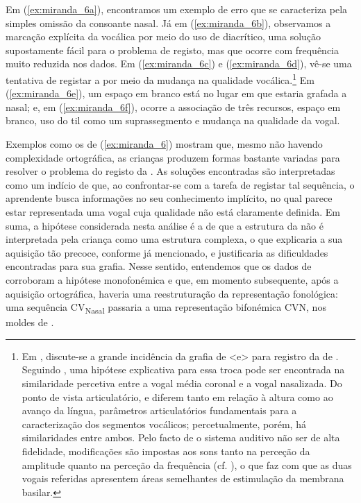 \documentclass[output=paper]{LSP/langsci}
\begin{document}
	Em (\ref{ex:miranda_6a}), encontramos um exemplo de erro que se caracteriza pela simples omissão da consoante nasal. Já em (\ref{ex:miranda_6b}), observamos a marcação explícita da  vocálica por meio do uso de diacrítico, uma solução supostamente fácil para o problema de registo, mas que ocorre com frequência muito reduzida nos dados. Em (\ref{ex:miranda_6c}) e (\ref{ex:miranda_6d}), vê-se uma tentativa de registar a  por meio da mudança na qualidade vocálica.\footnote{Em \citet{miranda2009}, discute-se a grande incidência da grafia de <e> para registro da  de . Seguindo \citet{berti_etal2008}, uma hipótese explicativa para essa troca pode ser encontrada na similaridade percetiva entre a vogal média coronal e a vogal nasalizada. Do ponto de vista articulatório,  e  diferem tanto em relação à altura como ao avanço da língua, parâmetros articulatórios fundamentais para a caracterização dos segmentos vocálicos; percetualmente, porém, há similaridades entre ambos. Pelo facto de o sistema auditivo não ser de alta fidelidade, modificações são impostas aos sons tanto na perceção da amplitude quanto na perceção da frequência (cf. \citealt{humejohnson2001}), o que faz com que as duas vogais referidas apresentem áreas semelhantes de estimulação da membrana basilar.} Em (\ref{ex:miranda_6e}), um espaço em branco está no lugar em que estaria grafada a nasal; e, em (\ref{ex:miranda_6f}), ocorre a associação de três recursos, espaço em branco, uso do til como um suprassegmento e mudança na qualidade da vogal.
    
Exemplos como os de (\ref{ex:miranda_6}) mostram que, mesmo não havendo complexidade ortográfica, as crianças produzem formas bastante variadas para resolver o problema do registo da . As soluções encontradas são interpretadas como um indício de que, ao confrontar-se com a tarefa de registar tal sequência, o aprendente busca informações no seu conhecimento implícito, no qual parece estar representada uma vogal cuja qualidade não está claramente definida. Em suma, a hipótese considerada nesta análise é a de que a estrutura da  não é interpretada pela criança como uma estrutura complexa, o que explicaria a sua aquisição tão precoce, conforme já mencionado, e justificaria as dificuldades encontradas para sua grafia. Nesse sentido, entendemos que os dados de  corroboram a hipótese monofonémica e que, em momento subsequente, após a aquisição ortográfica, haveria uma reestruturação da representação fonológica: uma sequência CV\textsubscript{Nasal} passaria a uma representação bifonémica CVN, nos moldes de \citet{camarajunior1970}. 
\end{document}
